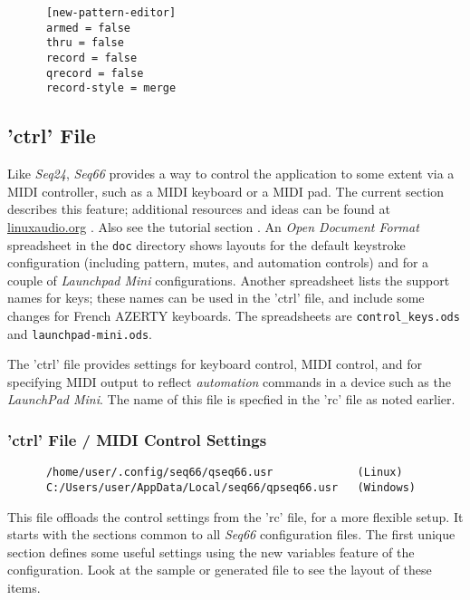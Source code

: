    \begin{verbatim}
      [new-pattern-editor]
      armed = false
      thru = false
      record = false
      qrecord = false
      record-style = merge
   \end{verbatim}

\subsection{'ctrl' File}
\label{subsec:configuration_ctrl}

   Like \textsl{Seq24}, \textsl{Seq66} provides a way to control the
   application to some extent via a MIDI controller, such as a MIDI keyboard or
   a MIDI pad.  The current section describes this feature;
   additional resources and ideas can be found at \url{linuxaudio.org}
   \cite{midicontrol}.
   Also see the tutorial section .
   An \textsl{Open Document Format} spreadsheet in the
   \texttt{doc} directory shows layouts for the default
   keystroke configuration (including pattern, mutes, and automation controls)
   and for a couple of \textsl{Launchpad Mini} configurations.
   Another spreadsheet lists the support names for keys; these names can be used
   in the 'ctrl' file, and include some changes for French AZERTY keyboards.
   The spreadsheets are
   \texttt{control\_keys.ods} and
   \texttt{launchpad-mini.ods}.

   The 'ctrl' file provides settings for keyboard control, MIDI control, and
   for specifying MIDI output to reflect \textsl{automation} commands in a
   device such as the \textsl{LaunchPad Mini}.  The name of this file is
   specfied in the 'rc' file as noted earlier.

\subsubsection{'ctrl' File / MIDI Control Settings}
\label{subsubsec:configuration_ctrl_midi_control_settings}

   \begin{verbatim}
      /home/user/.config/seq66/qseq66.usr             (Linux)
      C:/Users/user/AppData/Local/seq66/qpseq66.usr   (Windows)
   \end{verbatim}

   This file offloads the control settings from the 'rc' file, for a more
   flexible setup. It starts with the sections common to all \textsl{Seq66}
   configuration files.  The first unique section defines some useful settings
   using the new variables feature of the configuration.  Look at the sample or
   generated file to see the layout of these items.

